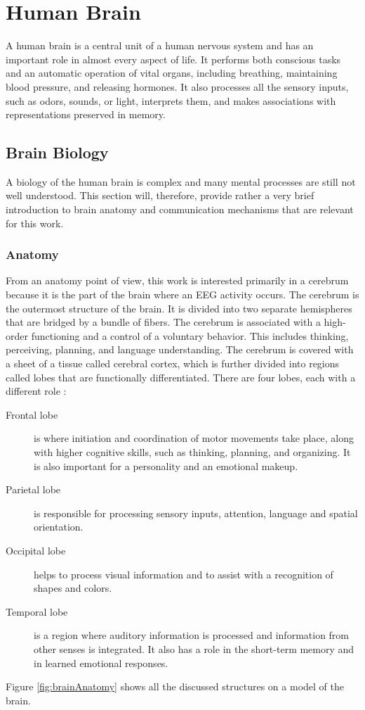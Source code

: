 \chapter{Human Brain} \label{humanBrain}
A human brain is a central unit of a human nervous system and has an important role in almost
every aspect of life. It performs both conscious tasks and an automatic operation
of vital organs, including breathing, maintaining blood pressure, and releasing
hormones. It also processes all the sensory inputs, such as odors, sounds, or light,
interprets them, and makes associations with representations preserved in memory.
\section{Brain Biology}
A biology of the human brain is complex and many mental processes are still not well understood. This section will, therefore, provide rather a very brief introduction to brain anatomy and communication mechanisms that are relevant for this work.
\subsection{Anatomy}
From an anatomy point of view, this work is interested primarily in a cerebrum because it is the part of the brain where an EEG activity occurs.
The cerebrum is the outermost structure of the brain. It is divided into two separate hemispheres that are
bridged by a bundle of fibers. The cerebrum is associated with a high-order
functioning and a control of a voluntary behavior. This includes thinking,
perceiving, planning, and language understanding. The cerebrum is covered with a
sheet of a tissue called cerebral cortex, which is further divided into regions called lobes
that are functionally differentiated. There are four lobes,
each with a different role \cite{brainFacts}: 
\begin{description}
	\item[Frontal lobe] is where initiation and coordination
	of motor movements take place, along with higher cognitive skills, such as
	thinking, planning, and organizing. It is also important for a personality and
	an emotional makeup.
	\item[Parietal lobe] is responsible for processing sensory
	inputs, attention, language and spatial orientation.
	\item[Occipital lobe]  helps to	process visual information and to assist with a recognition of shapes and colors.
	\item[Temporal lobe] is a region where auditory information is processed and
	information from other senses is integrated. It also has a role in the
	short-term memory and in learned emotional responses.
\end{description}
Figure \ref{fig:brainAnatomy} shows all the discussed structures on a model of the brain.

